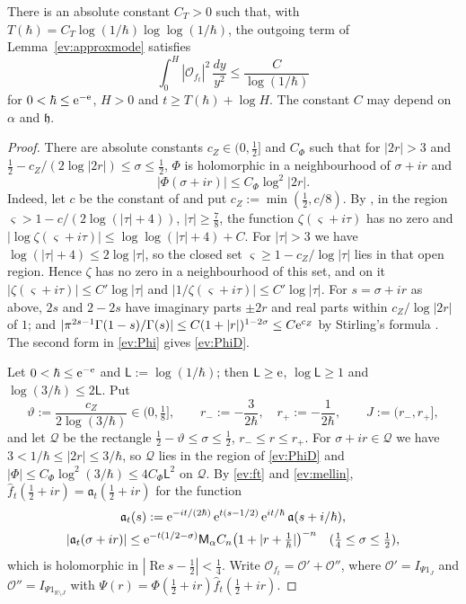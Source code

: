 \begin{lemma}\label{ev:outgoing}
There is an absolute constant $C_T>0$ such that, with $T(\hbar)=C_T\log(1/\hbar)\log\log(1/\hbar)$, the outgoing term of Lemma~\ref{ev:approxmode} satisfies
\[
 \int_0^H|\mathcal O_{f_t}|^2\,\frac{dy}{y^2}\le\frac{C}{\log(1/\hbar)}
\]
for $0<\hbar\le\mathrm{e}^{-\mathrm{e}}$, $H>0$ and $t\ge T(\hbar)+\log H$. The constant $C$ may depend on $\alpha$ and $\mathfrak h$.
\end{lemma}
\begin{proof} There are absolute constants $c_Z\in(0,\tfrac12]$ and $C_\Phi$ such that for $|2r|>3$ and
$\tfrac12-c_Z/(2\log|2r|)\le\sigma\le\tfrac12$, $\Phi$ is holomorphic in a neighbourhood of $\sigma+ir$ and
\begin{equation}\label{ev:PhiD}
  |\Phi(\sigma+ir)|\le C_\Phi\log^2|2r| .
\end{equation}
Indeed, let $c$ be the constant of \cite[Theorem~6.6]{MV07} and put $c_Z:=\min(\tfrac12,c/8)$. By \cite[Theorems~6.6 and~6.7]{MV07}, in the
region $\varsigma>1-c/(2\log(|\tau|+4))$, $|\tau|\ge\tfrac78$, the function $\zeta(\varsigma+i\tau)$ has no zero and
$|\log\zeta(\varsigma+i\tau)|\le\log\log(|\tau|+4)+C$. For $|\tau|>3$ we have $\log(|\tau|+4)\le2\log|\tau|$, so the closed set
$\varsigma\ge1-c_Z/\log|\tau|$ lies in that open region. Hence $\zeta$ has no zero in a neighbourhood of this set, and on it
$|\zeta(\varsigma+i\tau)|\le C'\log|\tau|$ and $|1/\zeta(\varsigma+i\tau)|\le C'\log|\tau|$. For $s=\sigma+ir$ as above, $2s$ and $2-2s$ have imaginary parts $\pm2r$ and real parts within $c_Z/\log|2r|$ of $1$; and
$|\pi^{2s-1}\Gamma(1-s)/\Gamma(s)|\le C(1+|r|)^{1-2\sigma}\le C\mathrm{e}^{c_Z}$ by Stirling's formula \cite[5.11.9]{DLMF}. The second form in \eqref{ev:Phi} gives \eqref{ev:PhiD}.

Let $0<\hbar\le\mathrm{e}^{-\mathrm{e}}$ and $\mathsf L:=\log(1/\hbar)$; then $\mathsf L\ge\mathrm{e}$, $\log\mathsf L\ge1$ and $\log(3/\hbar)\le2\mathsf L$. Put
\[
  \vartheta:=\frac{c_Z}{2\log(3/\hbar)}\in(0,\tfrac18],\qquad r_-:=-\frac3{2\hbar},\quad r_+:=-\frac1{2\hbar},\qquad J:=(r_-,r_+] ,
\]
and let $\mathcal Q$ be the rectangle $\tfrac12-\vartheta\le\sigma\le\tfrac12$, $r_-\le r\le r_+$. For $\sigma+ir\in\mathcal Q$ we have $3<1/\hbar\le|2r|\le3/\hbar$, so
$\mathcal Q$ lies in the region of \eqref{ev:PhiD} and $|\Phi|\le C_\Phi\log^2(3/\hbar)\le4C_\Phi\mathsf L^2$ on $\mathcal Q$. By \eqref{ev:ft} and \eqref{ev:mellin},
$\hat f_t(\tfrac12+ir)=\mathfrak a_t(\tfrac12+ir)$ for the function
\begin{gather*}
  \mathfrak a_t(s):=\mathrm{e}^{-it/(2\hbar)}\,\mathrm{e}^{t(s-1/2)}\,\mathrm{e}^{it/\hbar}\,\mathfrak a(s+i/\hbar),\\
  |\mathfrak a_t(\sigma+ir)|\le\mathrm{e}^{-t(1/2-\sigma)}\mathsf M_\alpha C_n\bigl(1+|r+\tfrac1\hbar|\bigr)^{-n}\quad(\tfrac14\le\sigma\le\tfrac12),
\end{gather*}
which is holomorphic in $|\operatorname{Re}s-\tfrac12|<\tfrac14$. Write $\mathcal O_{f_t}=\mathcal O'+\mathcal O''$, where $\mathcal O'=I_{\Psi1_J}$ and
$\mathcal O''=I_{\Psi1_{\mathbb R\setminus J}}$ with $\Psi(r)=\Phi(\tfrac12+ir)\hat f_t(\tfrac12+ir)$.


\end{proof}
